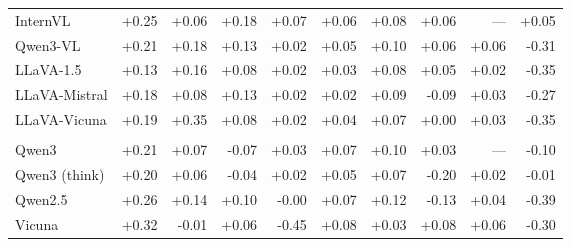 \begin{table}[t]
\begin{tabular}{>{\raggedright\arraybackslash}p{2.1cm}rrrrrrrrr}
\midrule
InternVL & \cellcolor{orange!25}+0.25 & \cellcolor{blue!10}+0.06 & \cellcolor{orange!25}+0.18 & +0.07 & +0.06 & \cellcolor{orange!25}+0.08 & \cellcolor{orange!25}+0.06 & --- & \cellcolor{orange!25}+0.05 \\
Qwen3-VL & +0.21 & \cellcolor{orange!25}+0.18 & \cellcolor{orange!25}+0.13 & \cellcolor{blue!10}+0.02 & +0.05 & \cellcolor{orange!25}+0.10 & \cellcolor{orange!25}+0.06 & \cellcolor{orange!25}+0.06 & \cellcolor{blue!10}-0.31 \\
LLaVA-1.5 & \cellcolor{blue!10}+0.13 & +0.16 & +0.08 & \cellcolor{blue!10}+0.02 & +0.03 & \cellcolor{orange!25}+0.08 & \cellcolor{orange!25}+0.05 & +0.02 & \cellcolor{blue!10}-0.35 \\
LLaVA-Mistral & +0.18 & \cellcolor{blue!10}+0.08 & \cellcolor{orange!25}+0.13 & \cellcolor{blue!10}+0.02 & +0.02 & \cellcolor{orange!25}+0.09 & \cellcolor{blue!10}-0.09 & \cellcolor{orange!25}+0.03 & \cellcolor{blue!10}-0.27 \\
LLaVA-Vicuna & +0.19 & \cellcolor{orange!25}+0.35 & +0.08 & \cellcolor{blue!10}+0.02 & +0.04 & +0.07 & +0.00 & \cellcolor{orange!25}+0.03 & \cellcolor{blue!10}-0.35 \\
\midrule
\multicolumn{10}{c}{\textit{SA-LLMs}} \\
\midrule
Qwen3 & +0.21 & \cellcolor{blue!10}+0.07 & \cellcolor{blue!10}-0.07 & +0.03 & +0.07 & \cellcolor{orange!25}+0.10 & +0.03 & --- & \cellcolor{blue!10}-0.10 \\
Qwen3 (think) & +0.20 & \cellcolor{blue!10}+0.06 & \cellcolor{blue!10}-0.04 & \cellcolor{blue!10}+0.02 & +0.05 & \cellcolor{orange!25}+0.07 & \cellcolor{blue!10}-0.20 & +0.02 & -0.01 \\
Qwen2.5 & \cellcolor{orange!25}+0.26 & +0.14 & +0.10 & \cellcolor{blue!10}-0.00 & +0.07 & \cellcolor{orange!25}+0.12 & \cellcolor{blue!10}-0.13 & \cellcolor{orange!25}+0.04 & \cellcolor{blue!10}-0.39 \\
Vicuna & \cellcolor{orange!25}+0.32 & \cellcolor{blue!10}-0.01 & +0.06 & \cellcolor{blue!10}-0.45 & +0.08 & +0.03 & \cellcolor{orange!25}+0.08 & \cellcolor{orange!25}+0.06 & \cellcolor{blue!10}-0.30 \\
\bottomrule
\end{tabular}
\end{table}
